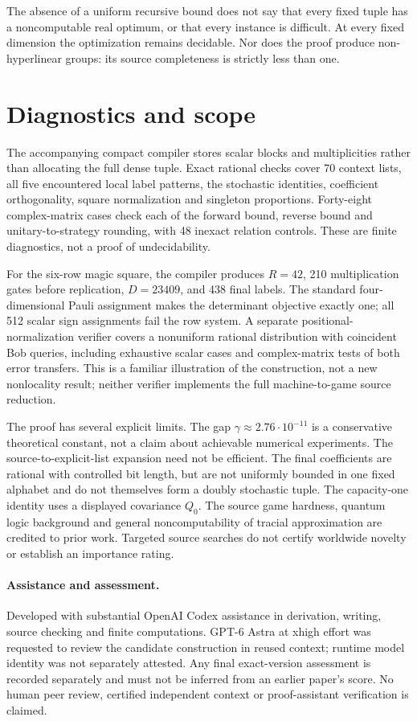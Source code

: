 \documentclass[11pt,a4paper]{article}
\begin{document}
The absence of a uniform recursive bound does not say that every fixed tuple has a noncomputable real optimum, or that every instance is difficult. At every fixed dimension the optimization remains decidable. Nor does the proof produce non-hyperlinear groups: its source completeness is strictly less than one.

\section{Diagnostics and scope}
The accompanying compact compiler stores scalar blocks and multiplicities rather than allocating the full dense tuple. Exact rational checks cover 70 context lists, all five encountered local label patterns, the stochastic identities, coefficient orthogonality, square normalization and singleton proportions. Forty-eight complex-matrix cases check each of the forward bound, reverse bound and unitary-to-strategy rounding, with 48 inexact relation controls. These are finite diagnostics, not a proof of undecidability.

For the six-row magic square, the compiler produces $R=42$, 210 multiplication gates before replication, $D=23409$, and 438 final labels. The standard four-dimensional Pauli assignment makes the determinant objective exactly one; all 512 scalar sign assignments fail the row system. A separate positional-normalization verifier covers a nonuniform rational distribution with coincident Bob queries, including exhaustive scalar cases and complex-matrix tests of both error transfers. This is a familiar illustration of the construction, not a new nonlocality result; neither verifier implements the full machine-to-game source reduction.

The proof has several explicit limits. The gap $\gamma\approx2.76\cdot10^{-11}$ is a conservative theoretical constant, not a claim about achievable numerical experiments. The source-to-explicit-list expansion need not be efficient. The final coefficients are rational with controlled bit length, but are not uniformly bounded in one fixed alphabet and do not themselves form a doubly stochastic tuple. The capacity-one identity uses a displayed covariance $Q_0$. The source game hardness, quantum logic background and general noncomputability of tracial approximation are credited to prior work. Targeted source searches do not certify worldwide novelty or establish an importance rating.

\paragraph{Assistance and assessment.}
Developed with substantial OpenAI Codex assistance in derivation, writing, source checking and finite computations. GPT-6 Astra at xhigh effort was requested to review the candidate construction in reused context; runtime model identity was not separately attested. Any final exact-version assessment is recorded separately and must not be inferred from an earlier paper's score. No human peer review, certified independent context or proof-assistant verification is claimed.
\end{document}

